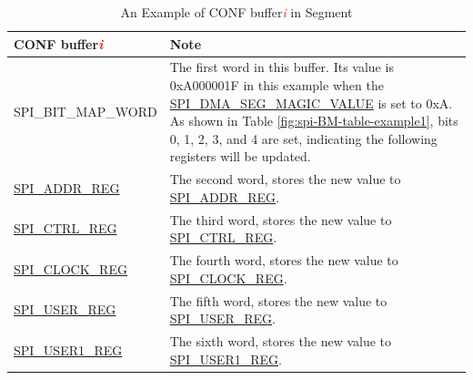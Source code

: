 \documentclass[main\_\_EN.tex]{subfiles}
\begin{document}
\clearpage
\begin{longtable}[c]{|L{3.5cm}|p{10cm}| }
\caption{An Example of CONF buffer\textcolor{red}{\it i} in Segment}
\label{fig:spi-BM-table-example2}\\\hline
{}
     \textbf{CONF buffer\textcolor{red}{\it i}} & \textbf{Note} \\\hline
     SPI\_BIT\_MAP\_WORD & The first word in this buffer. Its value is 0xA000001F in this example when the \hyperref[fielddesc:SPIDMASEGMAGICVALUE]{SPI\_DMA\_SEG\_MAGIC\_VALUE} is set to 0xA. As shown in Table \ref{fig:spi-BM-table-example1}, bits 0, 1, 2, 3, and 4 are set, indicating the following registers will be updated. \\\hline
     
     \hyperref[regdesc:SPIADDRREG]{SPI\_ADDR\_REG} & The second word, stores the new value to \hyperref[regdesc:SPIADDRREG]{SPI\_ADDR\_REG}.       
     \\\hline
     \hyperref[regdesc:SPICTRLREG]{SPI\_CTRL\_REG} & The third word, stores the new value to \hyperref[regdesc:SPICTRLREG]{SPI\_CTRL\_REG}.      
     \\\hline
     \hyperref[regdesc:SPICLOCKREG]{SPI\_CLOCK\_REG} & The fourth word, stores the new value to \hyperref[regdesc:SPICLOCKREG]{SPI\_CLOCK\_REG}.     
     \\\hline
     \hyperref[regdesc:SPIUSERREG]{SPI\_USER\_REG} & The    fifth word, stores the new value to \hyperref[regdesc:SPIUSERREG]{SPI\_USER\_REG}. 
     \\\hline
     \hyperref[regdesc:SPIUSER1REG]{SPI\_USER1\_REG}  & The sixth word, stores the new value to \hyperref[regdesc:SPIUSER1REG]{SPI\_USER1\_REG}.
     \\\hline
\end{longtable} 
\end{document}
